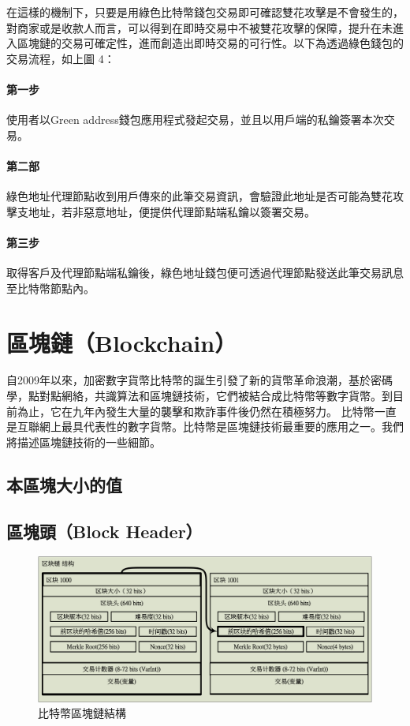 		 	在這樣的機制下，只要是用綠色比特幣錢包交易即可確認雙花攻擊是不會發生的，對商家或是收款人而言，可以得到在即時交易中不被雙花攻擊的保障，提升在未進入區塊鏈的交易可確定性，進而創造出即時交易的可行性。以下為透過綠色錢包的交易流程，如上圖 4：

		 	\paragraph{第一步}使用者以Green address錢包應用程式發起交易，並且以用戶端的私鑰簽署本次交易。
		 	\paragraph{第二部}綠色地址代理節點收到用戶傳來的此筆交易資訊，會驗證此地址是否可能為雙花攻擊支地址，若非惡意地址，便提供代理節點端私鑰以簽署交易。
		 	\paragraph{第三步}取得客戶及代理節點端私鑰後，綠色地址錢包便可透過代理節點發送此筆交易訊息至比特幣節點內。



	\section{區塊鏈（Blockchain）}
	自2009年以來，加密數字貨幣比特幣的誕生引發了新的貨幣革命浪潮，基於密碼學，點對點網絡，共識算法和區塊鏈技術，它們被結合成比特幣等數字貨幣。到目前為止，它在九年內發生大量的襲擊和欺詐事件後仍然在積極努力。 比特幣一直是互聯網上最具代表性的數字貨幣。比特幣是區塊鏈技術最重要的應用之一。我們將描述區塊鏈技術的一些細節。

		\subsection{本區塊大小的值 }
		\subsection{區塊頭（Block Header）}

		\begin{figure}[h]
			\centering
			\includegraphics[width = .9\textwidth]{blockchain.png}
			\caption{比特幣區塊鏈結構}\label{blockchain}
		\end{figure}

